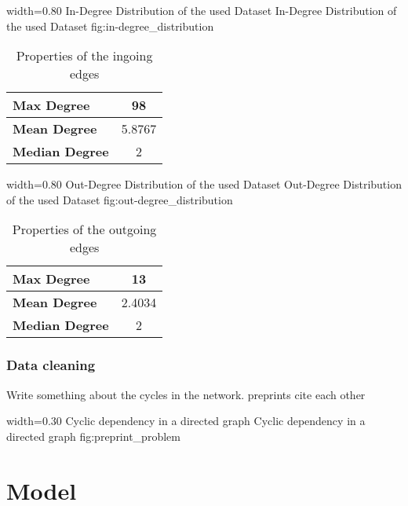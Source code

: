       {width=0.80\textwidth}
      {In-Degree Distribution of the used Dataset}
      {In-Degree Distribution of the used Dataset}
      {fig:in-degree_distribution}

\begin{table}
  \centering
  \begin{tabular}{ l c }
    \toprule
    \textbf{Max Degree} & 98 \\ \midrule
    \textbf{Mean Degree} & 5.8767 \\ \midrule
    \textbf{Median Degree} & 2 \\
    \bottomrule
  \end{tabular}
  \caption[Properties of the ingoing edges in the used dataset]{Properties of the ingoing edges}
  \label{tbl:properties_ingoing_edges}
\end{table}

      {width=0.80\textwidth}
      {Out-Degree Distribution of the used Dataset}
      {Out-Degree Distribution of the used Dataset}
      {fig:out-degree_distribution}

\begin{table}
  \centering
  \begin{tabular}{ l c }
    \toprule
    \textbf{Max Degree} & 13 \\ \midrule
    \textbf{Mean Degree} & 2.4034 \\ \midrule
    \textbf{Median Degree} & 2 \\
    \bottomrule
  \end{tabular}
  \caption[Properties of the outgoing edges in the used dataset]{Properties of the outgoing edges}
  \label{tbl:properties_outgoing_edges}
\end{table}

\subsubsection{Data cleaning}
\label{subsubsec:data_cleaning}
Write something about the cycles in the network. preprints cite each other

      {width=0.30\textwidth}
      {Cyclic dependency in a directed graph}
      {Cyclic dependency in a directed graph}
      {fig:preprint_problem}

\section{Model}
\label{sec:model}

